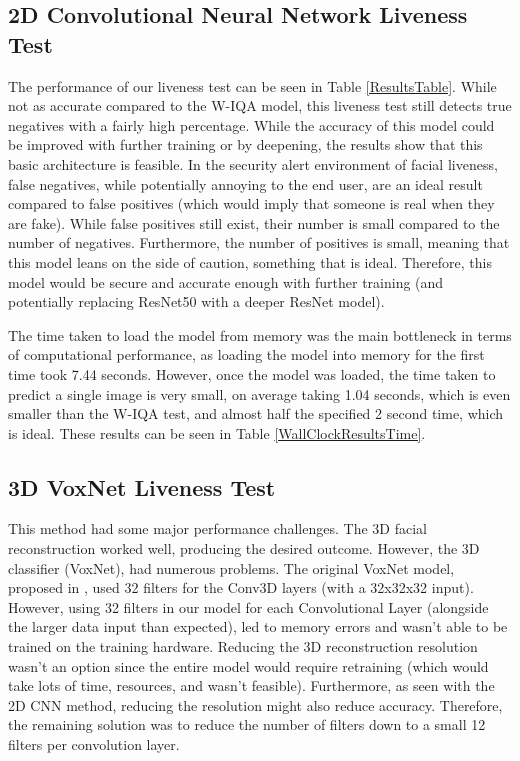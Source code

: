 \documentclass[10pt,a4paper]{article}
\begin{document}
    \subsection{2D Convolutional Neural Network Liveness Test}

    The performance of our liveness test can be seen in Table \ref{ResultsTable}. While not as accurate compared to the W-IQA model, this liveness test still detects true negatives with a fairly high percentage.
    While the accuracy of this model could be improved with further training or by deepening, the results show that this basic architecture is feasible. In the security alert environment of facial liveness,
    false negatives, while potentially annoying to the end user, are an ideal result compared to false positives (which would imply that someone is real when they are fake). While false positives still exist, their number is small compared to the number of negatives.
    Furthermore, the number of positives is small, meaning that this model leans on the side of caution, something that is ideal. Therefore, this model would be secure and accurate enough with further training (and potentially replacing ResNet50 with a deeper ResNet model).

    The time taken to load the model from memory was the main bottleneck in terms of computational performance, as loading the model into memory for the first time took 7.44 seconds. However, once the model was loaded,
    the time taken to predict a single image is very small, on average taking 1.04 seconds, which is even smaller than the W-IQA test, and almost half the specified 2 second time, which is ideal. These results can be seen in Table \ref{WallClockResultsTime}.     

    \subsection{3D VoxNet Liveness Test}
    This method had some major performance challenges. The 3D facial reconstruction worked well, producing the desired outcome. However, the 3D classifier (VoxNet), had numerous problems.
    The original VoxNet model, proposed in \cite{VoxNetModel}, used 32 filters for the Conv3D layers (with a 32x32x32 input). However, using 32 filters in our model for each Convolutional Layer (alongside the larger data input than expected),
    led to memory errors and wasn't able to be trained on the training hardware.  Reducing the 3D reconstruction resolution wasn't an option since the entire model would require retraining (which would take lots of time, resources, and wasn't feasible).
    Furthermore, as seen with the 2D CNN method, reducing the resolution might also reduce accuracy. Therefore, the remaining solution was to reduce the number of filters down to a small 12 filters per convolution layer.
\end{document}
